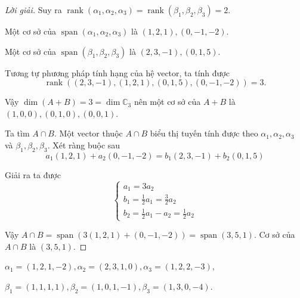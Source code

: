 \begin{proof}[Lời giải]
    Suy ra $\operatorname{rank}(\alpha_{1},\alpha_{2},\alpha_{3}) = \operatorname{rank}(\beta_{1},\beta_{2},\beta_{3}) = 2$.
    
    Một cơ sở của $\operatorname{span}(\alpha_{1},\alpha_{2},\alpha_{3})$ là $(1,2,1), (0,-1,-2)$.
    
    Một cơ sở của $\operatorname{span}(\beta_{1},\beta_{2},\beta_{3})$ là $(2,3,-1), (0,1,5)$.
    
    Tương tự phương pháp tính hạng của hệ vector, ta tính được
    \[ \operatorname{rank}((2,3,-1),(1,2,1),(0,1,5),(0,-1,-2)) = 3. \]
    
    Vậy $\dim (A + B) = 3 = \dim\mathbb{C}_{3}$ nên một cơ sở của $A + B$ là $(1,0,0), (0,1,0), (0,0,1)$.
    
    Ta tìm $A\cap B$. Một vector thuộc $A\cap B$ biểu thị tuyến tính được theo $\alpha_{1}, \alpha_{2}, \alpha_{3}$ và $\beta_{1}, \beta_{2}, \beta_{3}$. Xét ràng buộc sau
    \[ a_{1}(1,2,1) + a_{2}(0,-1,-2) = b_{1}(2,3,-1) + b_{2}(0,1,5) \]
    
    Giải ra ta được
    \[
        \begin{cases}
            a_{1} = 3a_{2}                              \\
            b_{1} = \frac{1}{2}a_{1} = \frac{3}{2}a_{2} \\
            b_{2} = \frac{1}{2}a_{1} - a_{2} = \frac{1}{2}a_{2}
        \end{cases}
    \]
    
    Vậy $A\cap B = \operatorname{span}(3(1,2,1) + (0,-1,-2)) = \operatorname{span}(3,5,1)$. Cơ sở của $A\cap B$ là $(3,5,1)$.
\end{proof}

\begin{exercise}
    $\alpha_{1} = (1,2,1,-2), \alpha_{2} = (2,3,1,0), \alpha_{3} = (1,2,2,-3)$,
    
    $\beta_{1} = (1,1,1,1), \beta_{2} = (1,0,1,-1), \beta_{3} = (1,3,0,-4)$.
\end{exercise}

